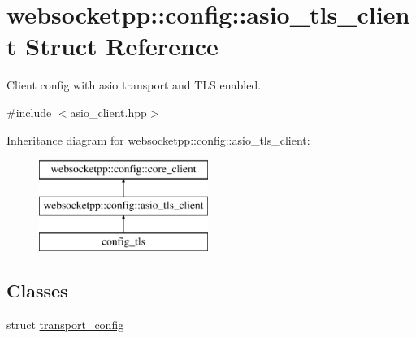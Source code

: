 \hypertarget{structwebsocketpp_1_1config_1_1asio__tls__client}{}\section{websocketpp\+:\+:config\+:\+:asio\+\_\+tls\+\_\+client Struct Reference}
\label{structwebsocketpp_1_1config_1_1asio__tls__client}


Client config with asio transport and T\+LS enabled.  




{\ttfamily \#include $<$asio\+\_\+client.\+hpp$>$}

Inheritance diagram for websocketpp\+:\+:config\+:\+:asio\+\_\+tls\+\_\+client\+:\begin{figure}[H]
\begin{center}
\leavevmode
\includegraphics[height=3.000000cm]{structwebsocketpp_1_1config_1_1asio__tls__client}
\end{center}
\end{figure}
\subsection*{Classes}
\begin{DoxyCompactItemize}
\item 
struct \hyperlink{structwebsocketpp_1_1config_1_1asio__tls__client_1_1transport__config}{transport\+\_\+config}
\end{DoxyCompactItemize}

